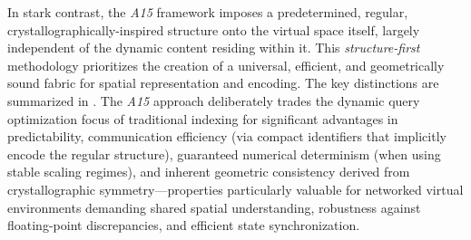 \documentclass[10pt]{article}
\def\AAAB{\textit{A15}}
\begin{document}
In stark contrast, the \AAAB{} framework imposes a predetermined, regular, crystallographically-inspired structure onto the virtual space itself, largely independent of the dynamic content residing within it. This \emph{structure-first} methodology prioritizes the creation of a universal, efficient, and geometrically sound fabric for spatial representation and encoding. The key distinctions are summarized in . The \AAAB{} approach deliberately trades the dynamic query optimization focus of traditional indexing for significant advantages in predictability, communication efficiency (via compact identifiers that implicitly encode the regular structure), guaranteed numerical determinism (when using stable scaling regimes), and inherent geometric consistency derived from crystallographic symmetry—properties particularly valuable for networked virtual environments demanding shared spatial understanding, robustness against floating-point discrepancies, and efficient state synchronization.
\end{document}
